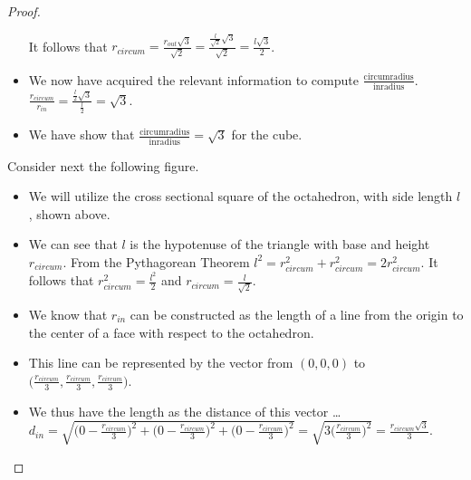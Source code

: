 \documentclass[12pt]{article}
\theoremstyle{plain}
\begin{document}
\begin{proof}
\begin{itemize}
    \subitem It follows that $\displaystyle r_{circum} = \frac{r_{out}\sqrt{3}}{\sqrt{2}} = \frac{\frac{l}{\sqrt{2}}\sqrt{3}}{\sqrt{2}} = \frac{l\sqrt{3}}{2} $.
    \item We now have acquired the relevant information to compute $\displaystyle \frac{\text{circumradius}}{\text{inradius}}$.
    \subitem $\displaystyle \frac{r_{circum}}{r_{in}} = \frac{\frac{l}{2}\sqrt{3}}{\frac{l}{2}} = \sqrt{3}$.
    \item We have show that $\displaystyle \frac{\text{circumradius}}{\text{inradius}}=\sqrt{3}$ for the cube.
  \end{itemize} 
  Consider next the following figure. \\
  \begin{center}
  \end{center}
  \begin{itemize}
  \item We will utilize the cross sectional square of the octahedron, with side length $l$, shown above. 
  \item We can see that $l$ is the hypotenuse of the triangle with base and height $r_{circum}$.
  \subitem From the Pythagorean Theorem $ l^{2} = r_{circum}^{2} + r_{circum}^{2} = 2r_{circum}^{2} $.
  \subitem It follows that $\displaystyle r_{circum}^{2} = \frac{l^{2}}{2} $ and $\displaystyle r_{circum} = \frac{l}{\sqrt{2}} $.
  \item We know that $r_{in}$ can be constructed as the length of a line from the origin to the center of a face with respect to the octahedron.
  \item This line can be represented by the vector from $ (0,0,0) $ to $\displaystyle \bigl( \frac{r_{circum}}{3}, \frac{r_{circum}}{3}, \frac{r_{circum}}{3} \bigr) $.
  \item We thus have the length as the distance of this vector \dots
  \subitem $ \displaystyle d_{in} = \sqrt{ \bigl( 0-\frac{r_{circum}}{3} \bigr)^{2} + \bigl( 0-\frac{r_{circum}}{3} \bigr)^{2} + \bigl( 0-\frac{r_{circum}}{3} \bigr)^{2}} = \sqrt{3\bigl( \frac{r_{circum}}{3} \bigr)^{2}} = \frac{r_{circum}\sqrt{3}}{3} $.

\end{itemize}
\end{proof}
\end{document}
